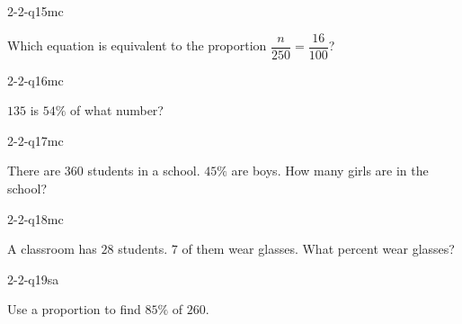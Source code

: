 \begin{practiceQuestion}{2-2-q15}{mc}
\begin{questionText}
Which equation is equivalent to the proportion $\dfrac{n}{250} = \dfrac{16}{100}$?
\end{questionText}
\end{practiceQuestion}

\begin{practiceQuestion}{2-2-q16}{mc}
\begin{questionText}
$135$ is $54\%$ of what number?
\end{questionText}
\end{practiceQuestion}

\begin{practiceQuestion}{2-2-q17}{mc}
\begin{questionText}
There are $360$ students in a school. $45\%$ are boys. How many girls are in the school?
\end{questionText}
\end{practiceQuestion}

\begin{practiceQuestion}{2-2-q18}{mc}
\begin{questionText}
A classroom has $28$ students. $7$ of them wear glasses. What percent wear glasses?
\end{questionText}
\end{practiceQuestion}


\begin{practiceQuestion}{2-2-q19}{sa}
\begin{questionText}
Use a proportion to find $85\%$ of $260$.
\end{questionText}
\end{practiceQuestion}

